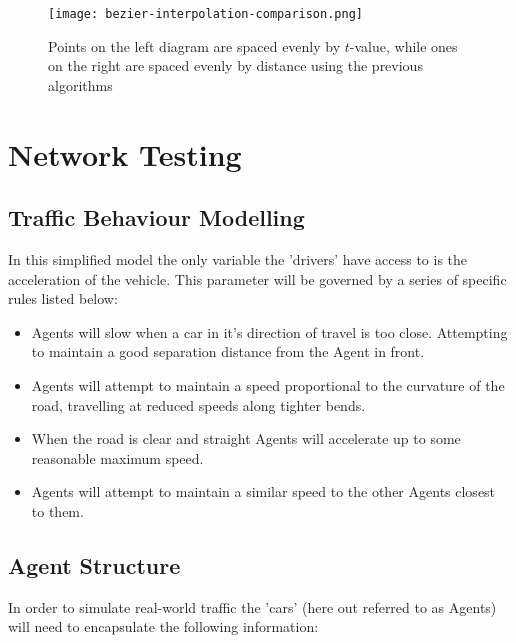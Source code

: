     \begin{figure}
        \centering
        \texttt{[image: bezier-interpolation-comparison.png]}
        \caption{Points on the left diagram are spaced evenly by $t$-value, while ones on the right are spaced evenly by distance using the previous algorithms}
        \label{bezier-interpolation-comparison-on-curves}
    \end{figure}

\section{Network Testing}

    \subsection{Traffic Behaviour Modelling}
    \label{subsection:traffic-behaviour-modelling}

        In this simplified model the only variable the 'drivers' have access to is the acceleration of the vehicle. This parameter will be governed by a series of specific rules listed below:

        \begin{itemize}
            \item Agents will slow when a car in it's direction of travel is too close. Attempting to maintain a good separation distance from the Agent in front.

            \item Agents will attempt to maintain a speed proportional to the curvature of the road, travelling at reduced speeds along tighter bends.

            \item When the road is clear and straight Agents will accelerate up to some reasonable maximum speed.

            \item Agents will attempt to maintain a similar speed to the other Agents closest to them.
        \end{itemize}

    \subsection{Agent Structure}

        In order to simulate real-world traffic the 'cars' (here out referred to as Agents) will need to encapsulate the following information:

